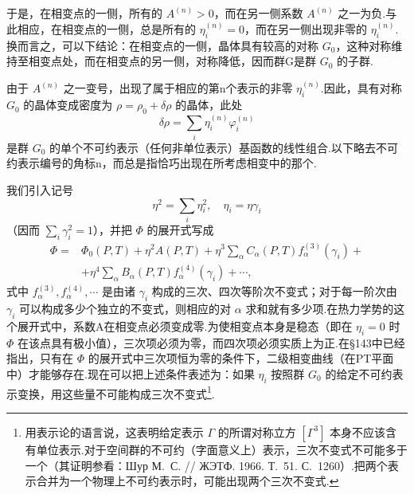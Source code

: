 于是，在相变点的一侧，所有的 $A^{(n)}>0$，而在另一侧系数 $A^{(n)}$ 之一为负.与此相应，在相变点的一侧，总是所有的 $\eta_i^{(n)}=0$，而在另一侧出现非零的 $\eta_i^{(n)}$.换而言之，可以下结论：在相变点的一侧，晶体具有较高的对称 $G_0$，这种对称维持至相变点处，而在相变点的另一侧，对称降低，因而群G是群 $G_0$ 的子群.

由于 $A^{(n)}$ 之一变号，出现了属于相应的第n个表示的非零 $\eta_i^{(n)}$.因此，具有对称 $G_0$ 的晶体变成密度为 $\rho=\rho_0+\delta\rho$ 的晶体，此处
\begin{equation}
  \delta\rho=\sum_i\eta_i^{(n)}\varphi_i^{(n)}
\end{equation}
是群 $G_0$ 的单个不可约表示（任何非单位表示）基函数的线性组合.以下略去不可约表示编号的角标n，而总是指恰巧出现在所考虑相变中的那个.

我们引入记号
\begin{equation}
  \eta^2=\sum_i\eta_i^2,\quad\eta_i=\eta\gamma_i
\end{equation}
（因而 $\sum_i\gamma_i^2=1$），并把 $\Phi$ 的展开式写成
\begin{equation}
\begin{aligned}
  \Phi={}&\Phi_0(P,T)+\eta^2A(P,T)
  +\eta^3\sum_\alpha C_\alpha(P,T)f_\alpha^{(3)}(\gamma_i)+{}\\
  &+\eta^4\sum_\alpha B_\alpha(P,T)f_\alpha^{(4)}(\gamma_i)+\cdots,
\end{aligned}
\end{equation}
式中 $f_\alpha^{(3)},f_\alpha^{(4)},\cdots$ 是由诸 $\gamma_i$ 构成的三次、四次等阶次不变式；对于每一阶次由 $\gamma_i$ 可以构成多少个独立的不变式，则相应的对 $\alpha$ 求和就有多少项.在热力学势的这个展开式中，系数A在相变点必须变成零.为使相变点本身是稳态（即在 $\eta_i=0$ 时 $\Phi$ 在该点具有极小值），三次项必须为零，而四次项必须实质上为正.在§143中已经指出，只有在 $\Phi$ 的展开式中三次项恒为零的条件下，二级相变曲线（在PT平面中）才能够存在.现在可以把上述条件表述为：如果 $\eta_i$ 按照群 $G_0$ 的给定不可约表示变换，用这些量不可能构成三次不变式\footnote{用表示论的语言说，这表明给定表示 $\Gamma$ 的所谓对称立方 $[\Gamma^3]$ 本身不应该含有单位表示.对于空间群的不可约（字面意义上）表示，三次不变式不可能多于一个（其证明参看：Шур М.~С. // ЖЭТФ. 1966. Т.~51. С.~1260）.把两个表示合并为一个物理上不可约表示时，可能出现两个三次不变式.}.

